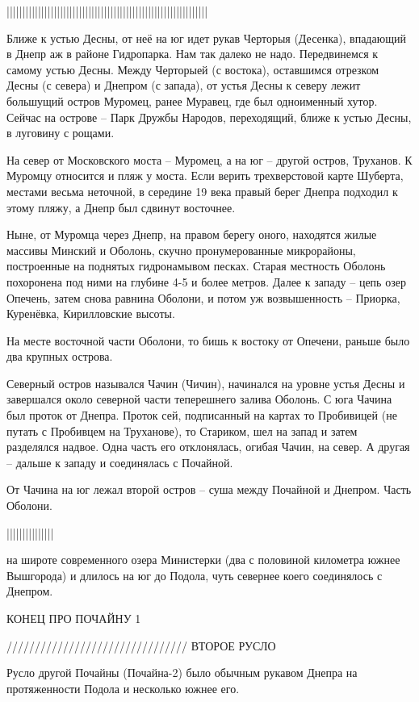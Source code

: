 ||||||||||||||||||||||||||||||||||||||||||||||||||||||||||||||||

Ближе к устью Десны, от неё на юг идет рукав Черторыя (Десенка), впадающий в Днепр аж в районе Гидропарка. Нам так далеко не надо. Передвинемся к самому устью Десны. Между Черторыей (с востока), оставшимся отрезком Десны (с севера) и Днепром (с запада), от устья Десны к северу лежит большущий остров Муромец, ранее Муравец, где был одноименный хутор. Сейчас на острове – Парк Дружбы Народов, переходящий, ближе к устью Десны, в луговину с рощами.

На север от Московского моста – Муромец, а на юг – другой остров, Труханов. К Муромцу относится и пляж у моста. Если верить трехверстовой карте Шуберта, местами весьма неточной, в середине 19 века правый берег Днепра подходил к этому пляжу, а Днепр был сдвинут восточнее.

Ныне, от Муромца через Днепр, на правом берегу оного, находятся жилые массивы Минский и Оболонь, скучно пронумерованные микрорайоны, построенные на поднятых гидронамывом песках.  Старая местность Оболонь похоронена под ними на глубине 4-5 и более метров. Далее к западу – цепь озер Опечень, затем снова равнина Оболони, и потом уж возвышенность – Приорка, Куренёвка, Кирилловские высоты.

На месте восточной части Оболони, то бишь к востоку от Опечени, раньше было два крупных острова.

Северный остров назывался Чачин (Чичин), начинался на уровне устья Десны и завершался около северной части теперешнего залива Оболонь. С юга Чачина был проток от Днепра. Проток сей, подписанный на картах то Пробивицей (не путать с Пробивцем на Труханове), то Стариком, шел на запад и затем разделялся надвое. Одна часть его отклонялась, огибая Чачин, на север. А другая – дальше к западу и соединялась с Почайной.

От Чачина на юг лежал второй остров – суша между Почайной и Днепром. Часть Оболони.


|||||||||||||||


на широте современного озера Министерки (два с половиной километра южнее Вышгорода) и длилось на юг до Подола, чуть севернее коего соединялось с Днепром. 

КОНЕЦ ПРО ПОЧАЙНУ 1

////////////////////////////////
ВТОРОЕ РУСЛО


Русло другой Почайны (Почайна-2) было обычным рукавом Днепра на протяженности Подола и несколько южнее его.

